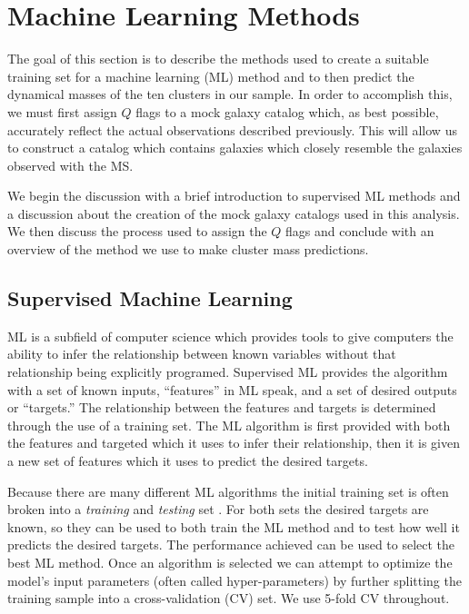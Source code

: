 \section{Machine Learning Methods}\label{2sec:ML methods}
The goal of this section is to describe the methods used to create a suitable training set for a machine learning (ML) method and to then predict the dynamical masses of the ten clusters in our sample. In order to accomplish this, we must first assign $Q$ flags to a mock galaxy catalog which, as best possible, accurately reflect the actual observations described previously. This will allow us to construct a catalog which contains galaxies which closely resemble the galaxies observed with the MS.

We begin the discussion with a brief introduction to supervised ML methods and a discussion about the creation of the mock galaxy catalogs used in this analysis. We then discuss the process used to assign the $Q$ flags and conclude with an overview of the method we use to make cluster mass predictions.

\subsection{Supervised Machine Learning}
ML is a subfield of computer science which provides tools to give computers the ability to infer the relationship between known variables without that relationship being explicitly programed. Supervised ML provides the algorithm with a set of known inputs, ``features'' in ML speak, and a set of desired outputs or ``targets.'' The relationship between the features and targets is determined through the use of a training set. The ML algorithm is first provided with both the features and targeted which it uses to infer their relationship, then it is given a new set of features which it uses to predict the desired targets. 

Because there are many different ML algorithms the initial training set is often broken into a \emph{training} and \emph{testing} set . For both sets the desired targets are known, so they can be used to both train the ML method and to test how well it predicts the desired targets. The performance achieved can be used to select the best ML method. Once an algorithm is selected we can attempt to optimize the model's input parameters (often called hyper-parameters) by further splitting the training sample into a cross-validation (CV) set. We use 5-fold CV throughout.

